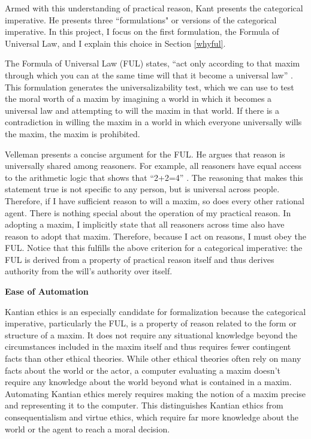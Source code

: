 \begin{isabellebody}
\begin{isamarkuptext}
Armed with this understanding of practical reason, Kant presents the categorical 
imperative. He presents three ``formulations" or versions of the categorical imperative. In this project, 
I focus on the first formulation, the Formula of Universal Law, and I explain this choice in Section \ref{whyful}.

The Formula of Universal Law (FUL) states, ``act only according to that maxim through which you can 
at the same time will that it become a universal law'' \cite[34]{groundwork}. This formulation
generates the universalizability test, which we can use to test the moral worth of a maxim by 
imagining a world in which it becomes a universal law and attempting to will the maxim in that world.
If there is a contradiction in willing the maxim in a world in which everyone universally wills the maxim,
the maxim is prohibited. 

Velleman presents a concise argument for the FUL. He argues that reason is universally shared among reasoners. For 
example, all reasoners have equal access to the arithmetic logic that shows that ``2+2=4'' \cite[29]{velleman}. The 
reasoning that makes this statement true is not specific to any person, but is universal across people. 
Therefore, if I have sufficient reason to will a maxim, so does every other rational agent. There is 
nothing special about the operation of my practical reason. 
In adopting a maxim, I implicitly state that all reasoners
across time also have reason to adopt that maxim. Therefore, because I act on reasons, I must obey the 
FUL. Notice that this fulfills the above criterion for a categorical imperative: the FUL is derived from 
a property of practical reason itself and thus derives authority from the will's authority over itself.%
\end{isamarkuptext}\isamarkuptrue%
%
\begin{isamarkuptext}%
\noindent \textbf{Ease of Automation}%
\end{isamarkuptext}\isamarkuptrue%
%
\begin{isamarkuptext}%
Kantian ethics is an especially candidate for formalization because the categorical imperative, particularly the FUL, 
is a property of reason related to the form or structure of a maxim. It does not require any situational 
knowledge beyond the circumstances included
in the maxim itself and thus requires fewer contingent facts than other ethical theories.
While other ethical theories often rely on many facts about 
the world or the actor, a computer evaluating 
a maxim doesn't require any knowledge about the world beyond what is contained in a maxim. Automating 
Kantian ethics merely requires making the notion of a maxim precise and representing it to the computer. 
This distinguishes Kantian ethics from consequentialism and virtue ethics, which
require far more knowledge about the world or the agent to reach a moral decision.


\end{isamarkuptext}
\end{isabellebody}
